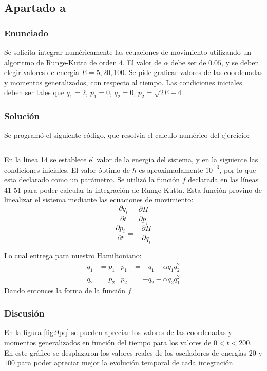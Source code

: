 \documentclass[a4paper,10pt]{paper}
\begin{document}
\subsection{Apartado a}
\subsubsection{Enunciado}
Se solicita integrar num\'ericamente las ecuaciones de movimiento utilizando un algoritmo
de Runge-Kutta de orden 4. El valor de $\alpha$ debe ser de $0.05$, y se deben elegir valores de energ\'{i}a 
$E = 5, 20, 100$. 
Se pide graficar valores de las coordenadas y momentos generalizados, con respecto al tiempo.
Las condiciones iniciales deben ser tales que $q_1 = 2$, $p_1 = 0$, $q_2=0$, $p_2=\sqrt{2E-4}$.

\subsubsection{Soluci\'on}
Se program\'o el siguiente c\'odigo, que resolvia el calculo num\'erico del ejercicio:
\inputminted[firstline=16, linenos, firstnumber=1]{fortran}{../9/ej9a.f90}
En la l\'{i}nea 14 se establece el valor de la energ\'{i}a del sistema, y en la siguiente
las condiciones iniciales.
El valor \'optimo de $h$ es aproximadamente $10^{-3}$, por lo que esta declarado como un par\'ametro.
Se utiliz\'o la funci\'on $f$ declarada en las l\'{i}neas 41-51 para poder calcular la integraci\'on de Runge-Kutta.
Esta funci\'on provino de linealizar el sistema mediante las ecuaciones de movimiento:
\begin{displaymath}
 \frac{\partial q_i}{\partial t} = \frac{\partial H}{\partial p_i} 
\end{displaymath}
\begin{displaymath}
 \frac{\partial p_i}{\partial t} = - \frac{\partial H}{\partial q_i}
\end{displaymath}

Lo cual entrega para nuestro Hamiltoniano:
\begin{align*}
 \dot{q_1} &= p_1  &   \dot{p_1} &= -q_1 -\alpha q_1 q_2^2 \\
 \dot{q_2} &= p_2  &   \dot{p_2} &= -q_2 -\alpha q_2 q_1^2
\end{align*}
Dando entonces la forma de la funci\'on $f$.

\subsubsection{Discusi\'on}
En la figura \ref{fig:9pq} se pueden apreciar los valores de las coordenadas y momentos generalizados en funci\'on
del tiempo para los valores de $0 < t < 200$. En este gr\'afico se desplazaron los valores reales de los osciladores
de energ\'ias $20$ y $100$ para poder apreciar mejor la evoluci\'on temporal de cada integraci\'on.
\end{document}
